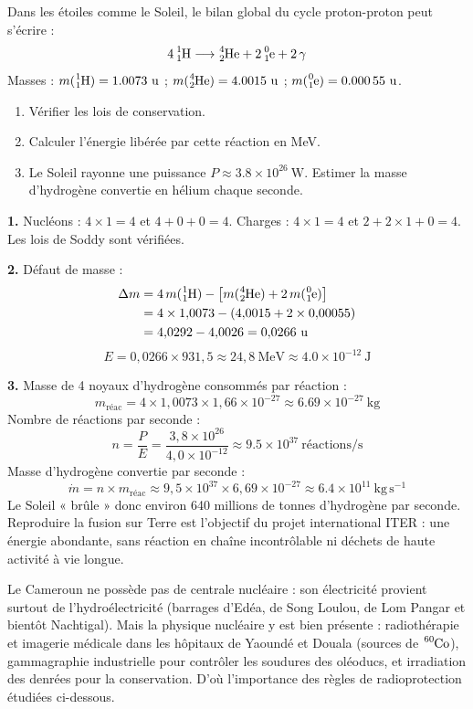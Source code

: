 \documentclass[11pt]{article}
\begin{document}
\begin{exoresolu}
Dans les étoiles comme le Soleil, le bilan global du cycle proton-proton peut s'écrire :
\[ 4\,\ce{^{1}_{1}H} \longrightarrow \ce{^{4}_{2}He} + 2\,\ce{^{0}_{1}e} + 2\,\gamma \]
Masses : $m(\ce{^{1}_{1}H}) = \num{1,0073}\ \mathrm{u}$ ; $m(\ce{^{4}_{2}He}) = \num{4,0015}\ \mathrm{u}$ ; $m(\ce{^{0}_{1}e}) = \num{0,00055}\ \mathrm{u}$.
\begin{enumerate}
\item Vérifier les lois de conservation.
\item Calculer l'énergie libérée par cette réaction en MeV.
\item Le Soleil rayonne une puissance $P \approx \num{3,8}\times 10^{26}\ \mathrm{W}$. Estimer la masse d'hydrogène convertie en hélium chaque seconde.
\end{enumerate}
\tcblower
\textbf{1.} Nucléons : $4\times 1 = 4$ et $4 + 0 + 0 = 4$. Charges : $4\times 1 = 4$ et $2 + 2\times 1 + 0 = 4$. Les lois de Soddy sont vérifiées.

\textbf{2.} Défaut de masse :
\begin{align*}
\Delta m &= 4\,m(\ce{^{1}_{1}H}) - \left[m(\ce{^{4}_{2}He}) + 2\,m(\ce{^{0}_{1}e})\right] \\
&= 4\times 1{,}0073 - (4{,}0015 + 2\times 0{,}00055) \\
&= 4{,}0292 - 4{,}0026 = 0{,}0266\ \mathrm{u}
\end{align*}
\[ E = 0{,}0266 \times 931{,}5 \approx 24{,}8\ \mathrm{MeV} \approx \num{4,0}\times 10^{-12}\ \mathrm{J} \]

\textbf{3.} Masse de 4 noyaux d'hydrogène consommés par réaction :
\[ m_{\text{réac}} = 4 \times 1{,}0073 \times 1{,}66\times 10^{-27} \approx \num{6,69}\times 10^{-27}\ \mathrm{kg} \]
Nombre de réactions par seconde :
\[ n = \frac{P}{E} = \frac{3{,}8\times 10^{26}}{4{,}0\times 10^{-12}} \approx \num{9,5}\times 10^{37}\ \text{réactions/s} \]
Masse d'hydrogène convertie par seconde :
\[ \dot{m} = n \times m_{\text{réac}} \approx 9{,}5\times 10^{37} \times 6{,}69\times 10^{-27} \approx \num{6,4}\times 10^{11}\ \mathrm{kg\,s^{-1}} \]
Le Soleil « brûle » donc environ 640 millions de tonnes d'hydrogène par seconde. Reproduire la fusion sur Terre est l'objectif du projet international ITER : une énergie abondante, sans réaction en chaîne incontrôlable ni déchets de haute activité à vie longue.
\end{exoresolu}

\begin{savaistu}
Le Cameroun ne possède pas de centrale nucléaire : son électricité provient surtout de l'hydroélectricité (barrages d'Edéa, de Song Loulou, de Lom Pangar et bientôt Nachtigal). Mais la physique nucléaire y est bien présente : radiothérapie et imagerie médicale dans les hôpitaux de Yaoundé et Douala (sources de $\ce{^{60}Co}$), gammagraphie industrielle pour contrôler les soudures des oléoducs, et irradiation des denrées pour la conservation. D'où l'importance des règles de radioprotection étudiées ci-dessous.
\end{savaistu}
\end{document}

